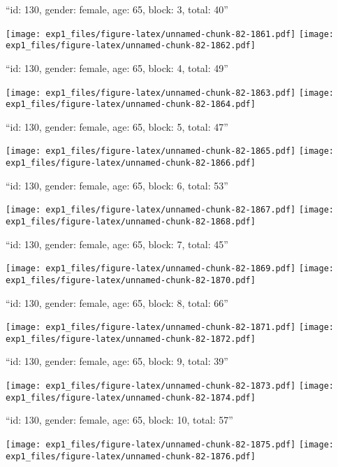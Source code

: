 \documentclass[11pt,,]{article}
\begin{document}
\newpage
[1] 

``id: 130, gender: female, age: 65, block: 3, total: 40''

\texttt{[image: exp1\_files/figure-latex/unnamed-chunk-82-1861.pdf]}
\texttt{[image: exp1\_files/figure-latex/unnamed-chunk-82-1862.pdf]}

\newpage
[1] 

``id: 130, gender: female, age: 65, block: 4, total: 49''

\texttt{[image: exp1\_files/figure-latex/unnamed-chunk-82-1863.pdf]}
\texttt{[image: exp1\_files/figure-latex/unnamed-chunk-82-1864.pdf]}

\newpage
[1] 

``id: 130, gender: female, age: 65, block: 5, total: 47''

\texttt{[image: exp1\_files/figure-latex/unnamed-chunk-82-1865.pdf]}
\texttt{[image: exp1\_files/figure-latex/unnamed-chunk-82-1866.pdf]}

\newpage
[1] 

``id: 130, gender: female, age: 65, block: 6, total: 53''

\texttt{[image: exp1\_files/figure-latex/unnamed-chunk-82-1867.pdf]}
\texttt{[image: exp1\_files/figure-latex/unnamed-chunk-82-1868.pdf]}

\newpage
[1] 

``id: 130, gender: female, age: 65, block: 7, total: 45''

\texttt{[image: exp1\_files/figure-latex/unnamed-chunk-82-1869.pdf]}
\texttt{[image: exp1\_files/figure-latex/unnamed-chunk-82-1870.pdf]}

\newpage
[1] 

``id: 130, gender: female, age: 65, block: 8, total: 66''

\texttt{[image: exp1\_files/figure-latex/unnamed-chunk-82-1871.pdf]}
\texttt{[image: exp1\_files/figure-latex/unnamed-chunk-82-1872.pdf]}

\newpage
[1] 

``id: 130, gender: female, age: 65, block: 9, total: 39''

\texttt{[image: exp1\_files/figure-latex/unnamed-chunk-82-1873.pdf]}
\texttt{[image: exp1\_files/figure-latex/unnamed-chunk-82-1874.pdf]}

\newpage
[1] 

``id: 130, gender: female, age: 65, block: 10, total: 57''

\texttt{[image: exp1\_files/figure-latex/unnamed-chunk-82-1875.pdf]}
\texttt{[image: exp1\_files/figure-latex/unnamed-chunk-82-1876.pdf]}
\end{document}
